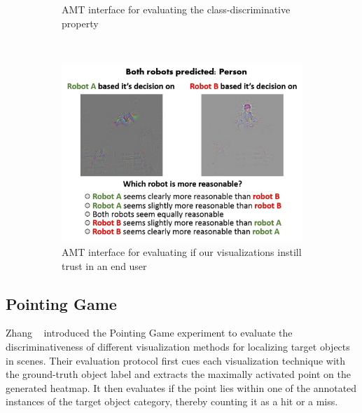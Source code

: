 \begin{figure}[ht]
\begin{subfigure}[b]{0.25\textwidth}
        \vspace{0.183in}
        \caption{\scriptsize{AMT interface for evaluating the class-discriminative property}}
		\label{fig:hs_clsdisc}
	\end{subfigure}
    \unskip\ \vrule\ \hspace{0.05in}
	\begin{subfigure}[b]{0.45\textwidth}
        \centering
        \includegraphics[width=0.95\linewidth]{figures/heval_3.jpg}
        \vspace{0.01in}
        \caption{\scriptsize{AMT interface for evaluating if our visualizations instill trust in an end user}}%
		\label{fig:hs_trust}
	\end{subfigure}
    \vspace{12pt}
	\caption{}
\label{fig:human_studies}
\end{figure}

\vspace{-15pt}
\subsection{Pointing Game}\label{sec:pointing_game}
\vspace{-2pt}

Zhang \etal~\cite{zhang2016top} introduced the Pointing Game experiment to evaluate the discriminativeness of
different visualization methods for localizing target objects in scenes.
Their evaluation protocol first cues each visualization technique with the ground-truth object label
and extracts the maximally activated point on the generated heatmap. 
It then evaluates if the point lies within one of the annotated instances of the target object category,
thereby counting it as a hit or a miss.

